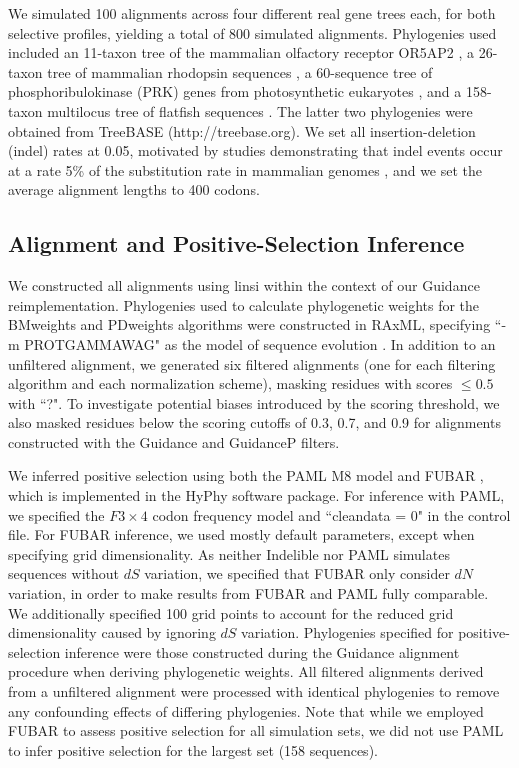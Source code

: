 \documentclass[11pt]{article}
\begin{document}
We simulated 100 alignments across four different real gene trees each, for both selective profiles, yielding a total of 800 simulated alignments. Phylogenies used included an 11-taxon tree of the mammalian olfactory receptor OR5AP2 \citep{Spielman2013}, a 26-taxon tree of mammalian rhodopsin sequences \citep{Spielman2013}, a 60-sequence tree of phosphoribulokinase (PRK) genes from photosynthetic eukaryotes \citep{Yang2011}, and a 158-taxon multilocus tree of flatfish sequences \citep{Betancur2013}. The latter two phylogenies were obtained from TreeBASE (http://treebase.org). We set all insertion-deletion (indel) rates at 0.05, motivated by studies demonstrating that indel events occur at a rate 5\% of the substitution rate in mammalian genomes \citep{Cooper2004}, and we set the average alignment lengths to 400 codons.

\subsection*{Alignment and Positive-Selection Inference}

We constructed all alignments using linsi \citep{Katoh2002,Katoh2005} within the context of our Guidance reimplementation. Phylogenies used to calculate phylogenetic weights for the BMweights and PDweights algorithms were constructed in RAxML, specifying ``-m PROTGAMMAWAG" as the model of sequence evolution \citep{Stamatakis2006}. In addition to an unfiltered alignment, we generated six filtered alignments (one for each filtering algorithm and each normalization scheme), masking residues with scores $\leq0.5$ with ``?". To investigate potential biases introduced by the scoring threshold, we also masked residues below the scoring cutoffs of 0.3, 0.7, and 0.9 for alignments constructed with the Guidance and GuidanceP filters.

We inferred positive selection using both the PAML M8 model \citep{Yang2007} and FUBAR \citep{Murrell2013}, which is implemented in the HyPhy \citep{Pond2005} software package. For inference with PAML, we specified the $F3\times4$ codon frequency model and ``cleandata = 0" in the control file. For FUBAR inference, we used mostly default parameters, except when specifying grid dimensionality. As neither Indelible nor PAML simulates sequences without $dS$ variation, we specified that FUBAR only consider $dN$ variation, in order to make results from FUBAR and PAML fully comparable. We additionally specified 100 grid points to account for the reduced grid dimensionality caused by ignoring $dS$ variation. Phylogenies specified for positive-selection inference were those constructed during the Guidance alignment procedure when deriving phylogenetic weights. All filtered alignments derived from a unfiltered alignment were processed with identical phylogenies to remove any confounding effects of differing phylogenies. Note that while we employed FUBAR to assess positive selection for all simulation sets, we did not use PAML to infer positive selection for the largest set (158 sequences).
\end{document}
